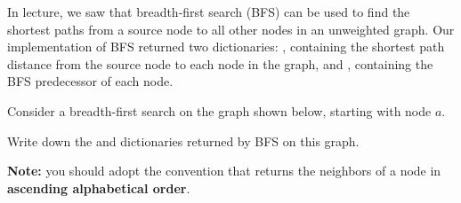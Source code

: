     

\begin{prob}
    In lecture, we saw that breadth-first search (BFS) can be used to find the
    shortest paths from a source node to all other nodes in an unweighted
    graph. Our implementation of BFS returned two dictionaries:
    , containing the shortest path distance from the source
    node to each node in the graph, and , containing the
    BFS predecessor of each node.

    Consider a breadth-first search on the graph shown below, starting with
    node $a$.

    \begin{center}
    \end{center}

    Write down the  and  dictionaries
    returned by BFS on this graph.

    \textbf{Note:} you should adopt the convention that 
    returns the neighbors of a node in \textbf{ascending alphabetical order}.

    \begin{soln}
        \inputminted{python}{\thisdir/include-solution/bfs_spd_answer.py}
    \end{soln}
\end{prob}
